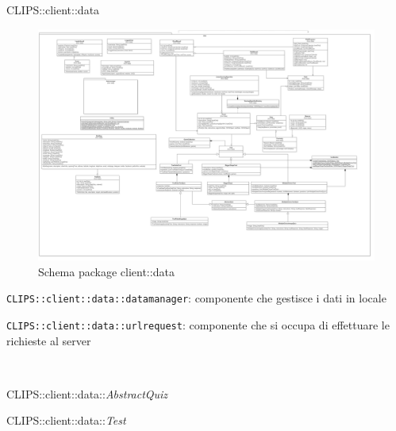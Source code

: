 \begin{componente}{CLIPS::client::data}
\begin{figure}[h!]
\centering
\includegraphics[scale=0.4]{img/package/png/client--data.png}
\caption{Schema package client::data}
 \end{figure}
\begin{compPackageContenuti}
\item \texttt{CLIPS::client::data::datamanager}: componente che gestisce i dati in locale
\item \texttt{CLIPS::client::data::urlrequest}: componente che si occupa di effettuare le richieste al server
\end{compPackageContenuti}
\begin{compClassi} \\
\begin{classe}{CLIPS::client::data::\textit{AbstractQuiz}}
\begin{classeAttributi}
\end{classeAttributi}
\end{classe}\begin{classe}{CLIPS::client::data::\textit{Test}}

\end{classe}
\end{compClassi}
\end{componente}
